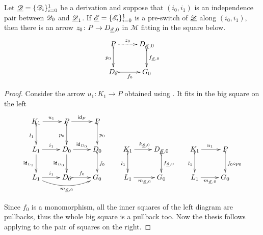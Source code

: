 \begin{corollary}\label{lem:cose}Let
	$\underline{\mathscr{D}}=\{\mathscr{D}_i\}_{i=0}^1$ be a derivation and suppose
	that $(i_0, i_1)$ is an independence pair between $\mathscr{D}_0$
	and $\underline{\mathscr{D}}_1$.  If $\underline{\mathscr{E}}=\{\mathscr{E}_i\}_{i=0}^1$ is a
	pre-switch of $\underline{\mathscr{D}}$ along $(i_0, i_1)$, then there is an arrow
	$z_0\colon P\to D_{\underline{\mathscr{E}},0}$ in $\mathcal{M}$ fitting in the square below.
	\[\xymatrix{P \ar@{.>}[r]^-{z_0}  \ar@{>->}[d]_{p_0}& D_{\der{E}, 0} \ar@{>->}[d]^{f_{\der{E},0}} \\ D_0 \ar@{>->}[r]_{f_0} & G_0 }\]
\end{corollary}
\begin{proof}
	Consider the arrow $u_1\colon K_1\to P$ obtained using
	. It fits in the big square on the left
	\[		\xymatrix{K_1 \ar[r]^{u_1} \ar@{>->}[d]_{l_1}&P
		\ar[r]^{\id{P}}\ar@{>->}[d]_{p_0}& P\ar@{>->}[d]^{p_0}\\L_1
		\ar[d]_{\id{L_1}}\ar[r]^{i_1}&D_0 \ar[r]^{\id{D_0}}
		\ar[d]_{\id{D_0}}& D_{0} \ar@{>->}[d]^{f_0}&K_1 \ar@{>->}[d]_{l_1}\ar[r]^{k_{\der{E},0}}&
		D_{\der{E},0} \ar@{>->}[d]^{f_{\der{E},0}} & K_1 \ar[r]^{u_1}
		\ar@{>->}[d]_{l_1}& P \ar@{>->}[d]^{f_0\circ
			p_0}\\
		L_1\ar[r]^{i_1} \ar@/_.4cm/[rr]_{m_{\der{E},0}}&D_0
		\ar@{>->}[r]^{f_0}&G_0 & L_1\ar[r]_{m_{\der{E},0}}&G_0 &L_1
		\ar[r]_{m_{\der{E},0}}&G_0}\]
	
	Since $f_0$ is a monomorphism, all the inner squares of the left diagram are pullbacks, thus the whole big square is a pullback too.
	Now the thesis follows applying  to the pair of squares on the right.
	\end{proof}
	

